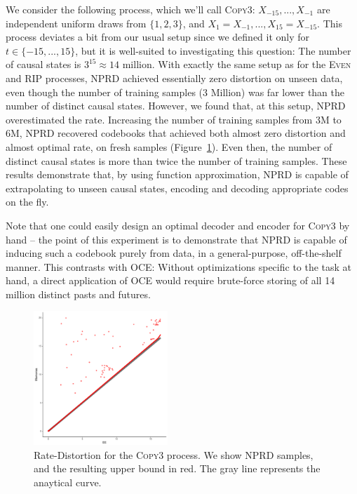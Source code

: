 \documentclass[11pt,letterpaper]{article}
\newif \ifcomment
\newcommand\rljf[1]{\ifcomment{{\color{blue}(#1)}}\else{}\fi}
\begin{document}
We consider the following process, which we'll call \textsc{Copy3}: $X_{-15}, ..., X_{-1}$ are independent uniform draws from $\{1,2,3\}$, and $X_1 = X_{-1}, ..., X_{15} = X_{-15}$.
This process deviates a bit from our usual setup since we defined it only for $t \in \{-15, ..., 15\}$, but it is well-suited to investigating this question:
The number of causal states is $3^{15} \approx 14$ million.
With exactly the same setup as for the \textsc{Even} and \textsc{RIP} processes, NPRD achieved essentially zero distortion on unseen data, even though the number of training samples (3 Million) was far lower than the number of distinct causal states.
However, we found that, at this setup, NPRD overestimated the rate.
Increasing the number of training samples from 3M to 6M, NPRD recovered codebooks that achieved both almost zero distortion and almost optimal rate, on fresh samples (Figure~\ref{fig:repeat}).
Even then, the number of distinct causal states is more than twice the number of training samples.
These results demonstrate that, by using function approximation, NPRD is capable of extrapolating to unseen causal states, encoding and decoding appropriate codes on the fly.


Note that one could easily design an optimal decoder and encoder for \textsc{Copy3} by hand -- the point of this experiment is to demonstrate that NPRD is capable of inducing such a codebook purely from data, in a general-purpose, off-the-shelf manner.
This contrasts with OCE:
Without optimizations specific to the task at hand, a direct application of OCE would require brute-force storing of all 14 million distinct pasts and futures.



\begin{figure}
\includegraphics[width=0.45\textwidth]{code/figures/repeat3-ee-mem-frontier.pdf}
	\caption{Rate-Distortion for the \textsc{Copy3} process. We show NPRD samples, and the resulting upper bound in red. The gray line represents the anaytical curve.}\label{fig:repeat}
\end{figure}
\end{document}
